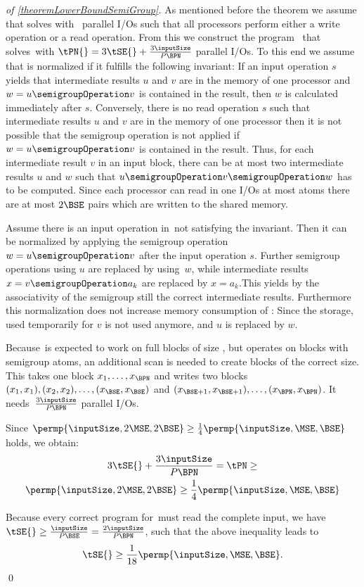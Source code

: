 \documentclass[envcountsame]{llncs}
\begin{document}
\begin{proof}[of \autoref{theoremLowerBoundSemiGroup}]
As mentioned before the theorem we assume that \progSE solves \instSE \linebreak with~\mbox{\tSE} parallel I/Os such that all processors perform either a write operation or a read operation.
From this we construct the program~\progPN{} that solves~\instPN with $\tPN{}=3\tSE{} + \frac{3\inputSize}{P\BPN}$ parallel I/Os. 
To this end we assume that \progSE is normalized if it fulfills the following invariant: 
If an input operation $s$ yields that intermediate results $u$ and $v$ are in the memory of one processor and $w=u\semigroupOperation v$ is contained in the result, then $w$ is calculated immediately after $s$.
Conversely, there is no read operation $s$ such that intermediate results $u$ and $v$ are in the memory of one processor then it is not possible that the semigroup operation is not applied if $w=u\semigroupOperation v$ is contained in the result.
Thus, for each intermediate result $v$ in an input block, there can be at most two intermediate results $u$ and $w$ such that $u\semigroupOperation v\semigroupOperation w$ has to be computed. Since each processor can read in one I/Os at most \BSE atoms there are at most $2\BSE$ pairs which are written to the shared memory. 


Assume there is an input operation in~\progSE not satisfying the invariant. 
Then it can be normalized by applying the semigroup operation $w=u\semigroupOperation v$ after the input operation $s$.
Further semigroup operations using $u$ are replaced by using~$w$, while intermediate results $x=v\semigroupOperation a_k$ are replaced by $x=a_k$.This yields by the associativity of the semigroup still the correct intermediate results. Furthermore this normalization does not increase memory consumption of \progSE:
Since the storage, used temporarily for $v$ is not used anymore, and $u$ is replaced by $w$. 

Because~\progPN is expected to work on full blocks of size \BPN, but \progSE operates on blocks with \BSE semigroup atoms, an additional scan is needed to create blocks of the correct size.
This takes one block $x_1,\ldots,x_{\BPN}$ and writes two blocks $(x_1,x_1), (x_2,x_2),\ldots,(x_{\BSE},x_{\BSE})$ and $(x_{\BSE+1},x_{\BSE+1}),\ldots,(x_{\BPN},x_{\BPN})$. 
It needs~$\frac{3\inputSize}{P\BPN}$ parallel I/Os.

Since $\permp{\inputSize,2\MSE,2\BSE} \geq \frac{1}{4}\permp{\inputSize,\MSE,\BSE}$ holds, we obtain:\begin{multline*}
 3\tSE{} + \frac{3\inputSize}{P\BPN} = \tPN \geq \\ \permp{\inputSize,2\MSE,2\BSE} \geq \frac{1}{4}\permp{\inputSize,\MSE,\BSE}
\end{multline*}

Because every correct program for~\tSE must read the complete input, we have $\tSE{}\geq \frac{\inputSize}{P\BSE}=\frac{2\inputSize}{P\BPN}$, such that the above inequality leads to 
\[
 \tSE{}  \geq  \frac{1}{18}\permp{\inputSize,\MSE,\BSE} . 
\]
\qed\end{proof}
\end{document}
